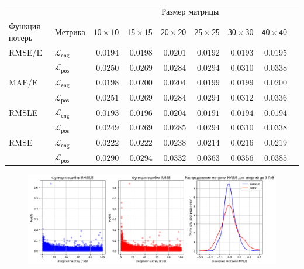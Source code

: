 \documentclass[a4paper,12pt]{extarticle}
\begin{document}
\begin{table}[ht]
	\footnotesize
	\centering
	\begin{tabular}{llrrrrrrr}
		\toprule
		{} & {} & \multicolumn{6}{c}{\textsf{Размер матрицы}} \\
		\cmidrule(lr){3-8}
		\textsf{Функция потерь} & \textsf{Метрика} & $\mathsf{10 \times 10}$ &  $\mathsf{15 \times 15}$ &  $\mathsf{20 \times 20}$ &  $\mathsf{25 \times 25}$ &  $\mathsf{30 \times 30}$ &  $\mathsf{40 \times 40}$ \\
		\midrule
        \textsf{RMSE/E} & $\mathcal{L}_{\mathsf{eng}}$ & $\mathsf{0.0194}$ & $\mathsf{0.0198}$ & $\mathsf{0.0201}$ & $\mathsf{0.0192}$ & $\mathsf{0.0193}$ & $\mathsf{0.0195}$ \\
        {} & $\mathcal{L}_{\mathsf{pos}}$ & $\mathsf{0.0250}$ & $\mathsf{0.0269}$ & $\mathsf{0.0284}$ & $\mathsf{0.0294}$ & $\mathsf{0.0310}$ & $\mathsf{0.0338}$ \\
        \midrule
        \textsf{MAE/E} & $\mathcal{L}_{\mathsf{eng}}$ & $\mathsf{0.0198}$ & $\mathsf{0.0200}$ & $\mathsf{0.0204}$ & $\mathsf{0.0199}$ & $\mathsf{0.0199}$ & $\mathsf{0.0200}$ \\
        {} & $\mathcal{L}_{\mathsf{pos}}$ & $\mathsf{0.0251}$ & $\mathsf{0.0269}$ & $\mathsf{0.0284}$ & $\mathsf{0.0294}$ & $\mathsf{0.0312}$ & $\mathsf{0.0336}$ \\
        \midrule
        \textsf{RMSLE} & $\mathcal{L}_{\mathsf{eng}}$ & $\mathsf{0.0193}$ & $\mathsf{0.0196}$ & $\mathsf{0.0204}$ & $\mathsf{0.0191}$ & $\mathsf{0.0194}$ & $\mathsf{0.0194}$ \\
        {} & $\mathcal{L}_{\mathsf{pos}}$ & $\mathsf{0.0249}$ & $\mathsf{0.0269}$ & $\mathsf{0.0285}$ & $\mathsf{0.0294}$ & $\mathsf{0.0310}$ & $\mathsf{0.0338}$ \\
        \midrule
        \textsf{RMSE} & $\mathcal{L}_{\mathsf{eng}}$ & $\mathsf{0.0222}$ & $\mathsf{0.0222}$ & $\mathsf{0.0238}$ & $\mathsf{0.0214}$ & $\mathsf{0.0216}$ & $\mathsf{0.0219}$ \\
        {} & $\mathcal{L}_{\mathsf{pos}}$ & $\mathsf{0.0290}$ & $\mathsf{0.0294}$ & $\mathsf{0.0332}$ & $\mathsf{0.0363}$ & $\mathsf{0.0356}$ & $\mathsf{0.0385}$ \\
		\bottomrule
	\end{tabular}
    \caption{}
	\label{table:loss_comp}
\end{table}

\begin{figure}
    \centering
    \includegraphics[width=1.0\textwidth]{graphics/exp2_distr_comp.png}
    \caption{}
    \label{graph:loss_distr}
\end{figure}
\end{document}
